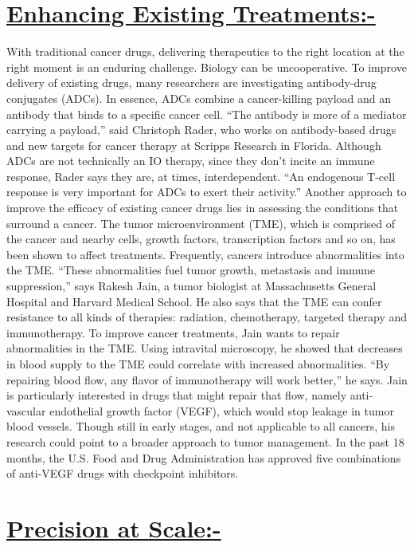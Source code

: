 \documentclass[12pt]{article}
\begin{document}
\section{\underline{Enhancing Existing Treatments:-}}
With traditional cancer drugs, delivering therapeutics to the right location at the right moment is an enduring challenge. Biology can be uncooperative. To improve delivery of existing drugs, many researchers are investigating antibody-drug conjugates (ADCs). In essence, ADCs combine a cancer-killing payload and an antibody that binds to a specific cancer cell.
“The antibody is more of a mediator carrying a payload,” said Christoph Rader, who works on antibody-based drugs and new targets for cancer therapy at Scripps Research in Florida. Although ADCs are not technically an IO therapy, since they don’t incite an immune response, Rader says they are, at times, interdependent. “An endogenous T-cell response is very important for ADCs to exert their activity.”
Another approach to improve the efficacy of existing cancer drugs lies in assessing the conditions that surround a cancer. The tumor microenvironment (TME), which is comprised of the cancer and nearby cells, growth factors, transcription factors and so on, has been shown to affect treatments. Frequently, cancers introduce abnormalities into the TME. “These abnormalities fuel tumor growth, metastasis and immune suppression,” says Rakesh Jain, a tumor biologist at Massachusetts General Hospital and Harvard Medical School. He also says that the TME can confer resistance to all kinds of therapies: radiation, chemotherapy, targeted therapy and immunotherapy.
To improve cancer treatments, Jain wants to repair abnormalities in the TME. Using intravital microscopy, he showed that decreases in blood supply to the TME could correlate with increased abnormalities. “By repairing blood flow, any flavor of immunotherapy will work better,” he says.
Jain is particularly interested in drugs that might repair that flow, namely anti-vascular endothelial growth factor (VEGF), which would stop leakage in tumor blood vessels. Though still in early stages, and not applicable to all cancers, his research could point to a broader approach to tumor management. In the past 18 months, the U.S. Food and Drug Administration has approved five combinations of anti-VEGF drugs with checkpoint inhibitors.

\section{\underline{Precision at Scale:-}}
\end{document}
